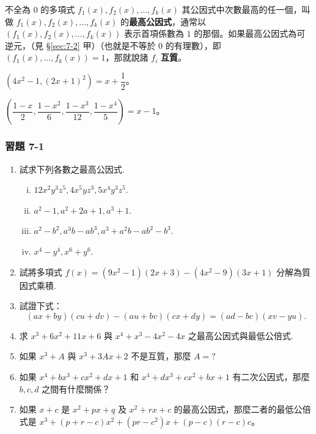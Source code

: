 \begin{definition*}
不全為 $0$ 的多項式 $f_1(x), f_2(x), \dots, f_k(x)$ 其公因式中次數最高的任一個，叫做 $f_1(x), f_2(x), \dots, f_k(x)$ 的\textbf{最高公因式}，通常以 $(f_1(x), f_2(x), \dots, f_k(x))$ 表示首項係數為 $1$ 的那個。如果最高公因式為可逆元，（見 \S\ref{sec:7-2} 甲）（也就是不等於 $0$ 的有理數），即 $(f_1(x), \dots, f_k(x)) = 1$，那就說諸 $f_i$ \textbf{互質}。
\end{definition*}

\begin{example}\label{ex:7-1-1}
$(4x^2-1, (2x+1)^2) = x + \dfrac{1}{2}$。
\end{example}

\begin{example}\label{ex:7-1-2}
$\left(\dfrac{1-x}{2}, \dfrac{1-x^2}{6}, \dfrac{1-x^3}{12}, \dfrac{1-x^4}{5}\right) = x-1$。
\end{example}

\subsubsection*{習題 7-1}\label{sec:ex7-1}

\begin{enumerate}[1.]
  \item 試求下列各數之最高公因式.
  \begin{enumerate}[(i)]
    \item $12x^2 y^3 z^5, 4x^5 y z^3, 5x^4 y^3 z^5$.
    \item $a^2-1, a^2+2a+1, a^3+1$.
    \item $a^2-b^2, a^3 b-a b^3, a^3+a^2 b-a b^2-b^3$.
    \item $x^4-y^4, x^6+y^6$.
  \end{enumerate}

  \item 試將多項式 $f(x) = (9x^2-1)(2x+3) - (4x^2-9)(3x+1)$ 分解為質因式乘積.

  \item 試證下式：
  \begin{equation*}
    (ax+by)(cu+dv) - (au+bv)(cx+dy) = (ad-bc)(xv-yu).
  \end{equation*}

  \item 求 $x^3+6x^2+11x+6$ 與 $x^4+x^3-4x^2-4x$ 之最高公因式與最低公倍式.

  \item 如果 $x^3+A$ 與 $x^3+3Ax+2$ 不是互質，那麼 $A = ?$

  \item 如果 $x^4+bx^3+cx^2+dx+1$ 和 $x^4+dx^3+cx^2+bx+1$ 有二次公因式，那麼 $b, c, d$ 之間有什麼關係？

  \item 如果 $x+c$ 是 $x^2+px+q$ 及 $x^2+rx+c$ 的最高公因式，那麼二者的最低公倍式是 $x^3+(p+r-c)x^2+(pr-c^2)x+(p-c)(r-c)c$。
\end{enumerate}

